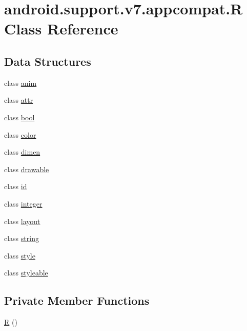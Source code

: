 \hypertarget{classandroid_1_1support_1_1v7_1_1appcompat_1_1_r}{}\section{android.\+support.\+v7.\+appcompat.\+R Class Reference}
\label{classandroid_1_1support_1_1v7_1_1appcompat_1_1_r}
\subsection*{Data Structures}
\begin{DoxyCompactItemize}
\item 
class \mbox{\hyperlink{classandroid_1_1support_1_1v7_1_1appcompat_1_1_r_1_1anim}{anim}}
\item 
class \mbox{\hyperlink{classandroid_1_1support_1_1v7_1_1appcompat_1_1_r_1_1attr}{attr}}
\item 
class \mbox{\hyperlink{classandroid_1_1support_1_1v7_1_1appcompat_1_1_r_1_1bool}{bool}}
\item 
class \mbox{\hyperlink{classandroid_1_1support_1_1v7_1_1appcompat_1_1_r_1_1color}{color}}
\item 
class \mbox{\hyperlink{classandroid_1_1support_1_1v7_1_1appcompat_1_1_r_1_1dimen}{dimen}}
\item 
class \mbox{\hyperlink{classandroid_1_1support_1_1v7_1_1appcompat_1_1_r_1_1drawable}{drawable}}
\item 
class \mbox{\hyperlink{classandroid_1_1support_1_1v7_1_1appcompat_1_1_r_1_1id}{id}}
\item 
class \mbox{\hyperlink{classandroid_1_1support_1_1v7_1_1appcompat_1_1_r_1_1integer}{integer}}
\item 
class \mbox{\hyperlink{classandroid_1_1support_1_1v7_1_1appcompat_1_1_r_1_1layout}{layout}}
\item 
class \mbox{\hyperlink{classandroid_1_1support_1_1v7_1_1appcompat_1_1_r_1_1string}{string}}
\item 
class \mbox{\hyperlink{classandroid_1_1support_1_1v7_1_1appcompat_1_1_r_1_1style}{style}}
\item 
class \mbox{\hyperlink{classandroid_1_1support_1_1v7_1_1appcompat_1_1_r_1_1styleable}{styleable}}
\end{DoxyCompactItemize}
\subsection*{Private Member Functions}
\begin{DoxyCompactItemize}
\item 
\mbox{\hyperlink{classandroid_1_1support_1_1v7_1_1appcompat_1_1_r_a1f2b7247035e93db2996bdfd46e318ae}{R}} ()
\end{DoxyCompactItemize}


